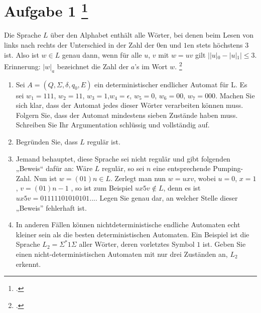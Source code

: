 \documentclass{lehramt-informatik-aufgabe}
\begin{document}
\liAufgabenTitel{}
\section{Aufgabe 1
\footcite{66115:2015:03}}

Die Sprache $L$ über den Alphabet  enthält alle Wörter,
bei denen beim Lesen von links nach rechts der Unterschied in der Zahl
der $0$en und $1$en stets höchstens 3 ist. Also ist $w \in L$ genau
dann, wenn für alle $u$, $v$ mit $w = uv$ gilt $||u|_0 - |u|_1| \leq 3$.
Erinnerung: $|w|_a$ bezeichnet die Zahl der $a$’s im Wort $w$.
\footcite{theo:ab:1}

\begin{enumerate}


\item Sei $A = (Q, \Sigma, \delta, q_0 , E)$ ein deterministischer
endlicher Automat für L. Es sei $w_1 = 111$, $w_2 = 11$, $w_3 = 1$,$ w_4
= \epsilon$, $w_5 = 0$, $w_6 = 00$, $w_7 = 000$. Machen Sie sich klar,
dass der Automat jedes dieser Wörter verarbeiten können muss. Folgern
Sie, dass der Automat mindestens sieben Zustände haben muss. Schreiben
Sie Ihr Argumentation schlüssig und vollständig auf.


\item Begründen Sie, dass $L$ regulär ist.


\item Jemand behauptet, diese Sprache sei nicht regulär und gibt
folgenden „Beweis“ dafür an: Wäre $L$ regulär, so sei $n$ eine
entsprechende Pumping-Zahl. Nun ist $w = (01) n \in L$. Zerlegt man nun
$w = uxv$, wobei $u = 0$, $x = 1$, $v = (01) n−1$ , so ist zum Beispiel
$ux 5 v \notin L$, denn es ist $ux 5 v = 01111101010101$.... Legen Sie
genau dar, an welcher Stelle dieser „Beweis” fehlerhaft ist.


\item In anderen Fällen können nichtdeterministische endliche Automaten
echt kleiner sein als die besten deterministischen Automaten. Ein
Beispiel ist die Sprache $L_2 = \Sigma^* 1 \Sigma$ aller Wörter, deren
vorletztes Symbol $1$ ist. Geben Sie einen nicht-deterministischen
Automaten mit nur drei Zuständen an, $L_2$ erkennt.

\begin{liAntwort}
\begin{center}
\end{center}
\end{liAntwort}
\end{enumerate}
\end{document}

